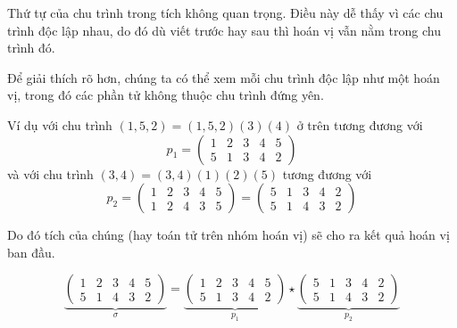 \begin{remark}
    Thứ tự của chu trình trong tích không quan trọng. 
    Điều này dễ thấy vì các chu trình độc lập nhau, do đó dù 
    viết trước hay sau thì hoán vị vẫn nằm trong chu trình đó.

    Để giải thích rõ hơn, chúng ta có thể xem mỗi chu
    trình độc lập như một hoán vị, trong đó các phần tử không
    thuộc chu trình đứng yên. 
    
    Ví dụ với chu trình $(1, 5, 2) = (1, 5, 2)(3)(4)$
    ở trên tương đương với \[p_1 = \begin{pmatrix}
        1 & 2 & 3 & 4 & 5 \\ 5 & 1 & 3 & 4 & 2
    \end{pmatrix}\] và với chu trình $(3, 4) = (3, 4)(1)(2)(5)$ tương đương với
    \[p_2 = \begin{pmatrix}
        1 & 2 & 3 & 4 & 5 \\ 1 & 2 & 4 & 3 & 5
    \end{pmatrix} = \begin{pmatrix}
        5 & 1 & 3 & 4 & 2 \\ 5 & 1 & 4 & 3 & 2
    \end{pmatrix}\]
    
    Do đó tích của chúng (hay toán tử trên
    nhóm hoán vị) sẽ cho ra kết quả hoán vị ban đầu.

    \[\underbrace{\begin{pmatrix}
        1 & 2 & 3 & 4 & 5 \\ 5 & 1 & 4 & 3 & 2
    \end{pmatrix}}_{\sigma} = \underbrace{\begin{pmatrix}
        1 & 2 & 3 & 4 & 5 \\ 5 & 1 & 3 & 4 & 2
    \end{pmatrix}}_{p_1} \star \underbrace{\begin{pmatrix}
        5 & 1 & 3 & 4 & 2 \\ 5 & 1 & 4 & 3 & 2 
    \end{pmatrix}}_{p_2}\]
\end{remark}